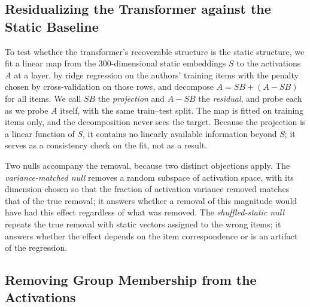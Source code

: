 \documentclass[11pt]{article}
\begin{document}
\subsection{Residualizing the Transformer against the Static Baseline}
\label{sec:residual_methods}

To test whether the transformer's recoverable structure is the static structure, we fit a linear map from the 300-dimensional static embeddings $S$ to the activations $A$ at a layer, by ridge regression on the authors' training items with the penalty chosen by cross-validation on those rows, and decompose $A = SB + (A - SB)$ for all items. We call $SB$ the \emph{projection} and $A - SB$ the \emph{residual}, and probe each as we probe $A$ itself, with the same train--test split. The map is fitted on training items only, and the decomposition never sees the target. Because the projection is a linear function of $S$, it contains no linearly available information beyond $S$; it serves as a consistency check on the fit, not as a result.

Two nulls accompany the removal, because two distinct objections apply. The
\emph{variance-matched null} removes a random subspace of activation space, with its
dimension chosen so that the fraction of activation variance removed matches that of
the true removal; it answers whether a removal of this magnitude would have had this
effect regardless of what was removed. The \emph{shuffled-static null} repeats the true
removal with static vectors assigned to the wrong items; it answers whether the effect
depends on the item correspondence or is an artifact of the regression.

\subsection{Removing Group Membership from the Activations}
\label{sec:group_methods}
\end{document}
